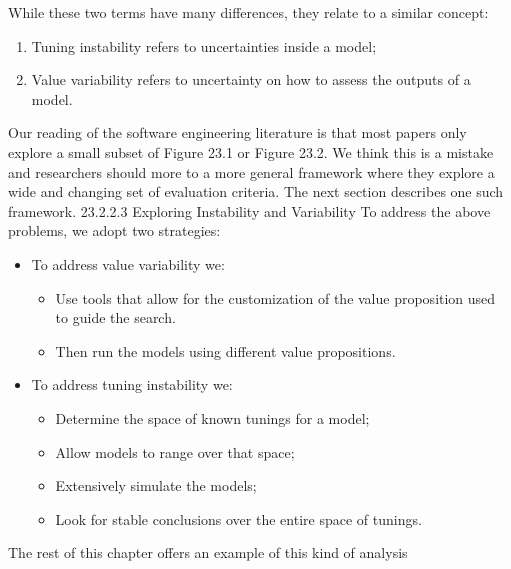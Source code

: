 \documentclass[table, xcdraw, sigconf,review, anonymous]{acmart}
\begin{document}
  
  While these two terms have many differences, they relate to a similar concept:
\begin{enumerate}
\item Tuning instability refers to uncertainties inside a model;
\item Value variability refers to uncertainty on how to assess the outputs of a model.
\end{enumerate}
Our reading of the software engineering literature is that most papers only explore
a small subset of Figure 23.1 or Figure 23.2. We think this is a mistake and researchers
should more to a more general framework where they explore a wide and changing set
of evaluation criteria. The next section describes one such framework.
23.2.2.3 Exploring Instability and Variability
To address the above problems, we adopt two strategies:
\begin{itemize}
\item  To address value variability we:
\begin{itemize}
    \item Use tools that allow for the customization of the value proposition used to
    guide the search.
    \item Then run the models using different value propositions.
\end{itemize}
\item To address tuning instability we:
\begin{itemize}
    \item Determine the space of known tunings for a model;
    \item Allow models to range over that space;
    \item Extensively simulate the models;
    \item Look for stable conclusions over the entire space of tunings.
\end{itemize}
\end{itemize}
The rest of this chapter offers an example of this kind of analysis
\end{document}

